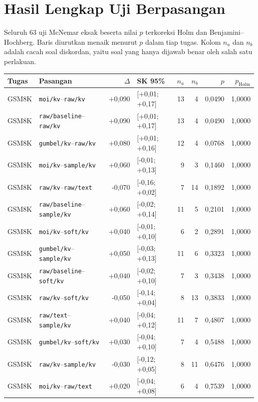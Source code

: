 \chapter{Hasil Lengkap Uji Berpasangan}
\label{lamp:uji}

Seluruh 63 uji McNemar eksak beserta nilai $p$ terkoreksi Holm dan Benjamini--Hochberg. Baris diurutkan menaik menurut $p$ dalam tiap tugas. Kolom $n_a$ dan $n_b$ adalah cacah soal diskordan, yaitu soal yang hanya dijawab benar oleh salah satu perlakuan.

\begin{longtable}{llrlrrrr}
\hline
Tugas & Pasangan & $\Delta$ & SK 95\% & $n_a$ & $n_b$ & $p$ & $p_{\text{Holm}}$ \\
\hline\endhead
GSM8K & \texttt{moi/kv}--\texttt{raw/kv} & +0,090 & [+0,01; +0,17] & 13 & 4 & 0,0490 & 1,0000 \\
GSM8K & \texttt{raw/baseline}--\texttt{raw/kv} & +0,090 & [+0,01; +0,17] & 13 & 4 & 0,0490 & 1,0000 \\
GSM8K & \texttt{gumbel/kv}--\texttt{raw/kv} & +0,080 & [+0,01; +0,16] & 12 & 4 & 0,0768 & 1,0000 \\
GSM8K & \texttt{moi/kv}--\texttt{sample/kv} & +0,060 & [-0,01; +0,13] & 9 & 3 & 0,1460 & 1,0000 \\
GSM8K & \texttt{raw/kv}--\texttt{raw/text} & -0,070 & [-0,16; +0,02] & 7 & 14 & 0,1892 & 1,0000 \\
GSM8K & \texttt{raw/baseline}--\texttt{sample/kv} & +0,060 & [-0,02; +0,14] & 11 & 5 & 0,2101 & 1,0000 \\
GSM8K & \texttt{moi/kv}--\texttt{soft/kv} & +0,040 & [-0,01; +0,10] & 6 & 2 & 0,2891 & 1,0000 \\
GSM8K & \texttt{gumbel/kv}--\texttt{sample/kv} & +0,050 & [-0,03; +0,13] & 11 & 6 & 0,3323 & 1,0000 \\
GSM8K & \texttt{raw/baseline}--\texttt{soft/kv} & +0,040 & [-0,02; +0,10] & 7 & 3 & 0,3438 & 1,0000 \\
GSM8K & \texttt{raw/kv}--\texttt{soft/kv} & -0,050 & [-0,14; +0,04] & 8 & 13 & 0,3833 & 1,0000 \\
GSM8K & \texttt{raw/text}--\texttt{sample/kv} & +0,040 & [-0,04; +0,12] & 11 & 7 & 0,4807 & 1,0000 \\
GSM8K & \texttt{gumbel/kv}--\texttt{soft/kv} & +0,030 & [-0,04; +0,10] & 7 & 4 & 0,5488 & 1,0000 \\
GSM8K & \texttt{raw/kv}--\texttt{sample/kv} & -0,030 & [-0,12; +0,05] & 8 & 11 & 0,6476 & 1,0000 \\
GSM8K & \texttt{moi/kv}--\texttt{raw/text} & +0,020 & [-0,04; +0,08] & 6 & 4 & 0,7539 & 1,0000 \\

\end{longtable}
